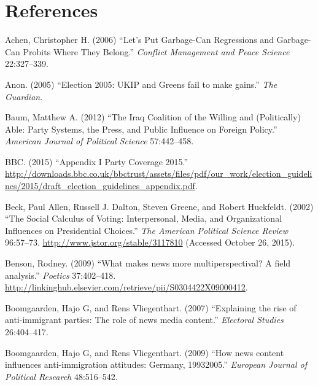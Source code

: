 \documentclass[12pt,article]{article}
\begin{document}
\pagebreak

\section{References}\label{references}

\raggedright

Achen, Christopher H. (2006) ``Let's Put Garbage-Can Regressions and
Garbage-Can Probits Where They Belong.'' \emph{Conflict Management and
Peace Science} 22:327--339.

Anon. (2005) ``Election 2005: UKIP and Greens fail to make gains.''
\emph{The Guardian}.

Baum, Matthew A. (2012) ``The Iraq Coalition of the Willing and
(Politically) Able: Party Systems, the Press, and Public Influence on
Foreign Policy.'' \emph{American Journal of Political Science}
57:442--458.

BBC. (2015) ``Appendix I Party Coverage 2015.''
\url{http://downloads.bbc.co.uk/bbctrust/assets/files/pdf/our_work/election_guidelines/2015/draft_election_guidelines_appendix.pdf}.

Beck, Paul Allen, Russell J. Dalton, Steven Greene, and Robert
Huckfeldt. (2002) ``The Social Calculus of Voting: Interpersonal, Media,
and Organizational Influences on Presidential Choices.'' \emph{The
American Political Science Review} 96:57--73.
\url{http://www.jstor.org/stable/3117810} (Accessed October 26, 2015).

Benson, Rodney. (2009) ``What makes news more multiperspectival? A field
analysis.'' \emph{Poetics} 37:402--418.
\url{http://linkinghub.elsevier.com/retrieve/pii/S0304422X09000412}.

Boomgaarden, Hajo G, and Rens Vliegenthart. (2007) ``Explaining the rise
of anti-immigrant parties: The role of news media content.''
\emph{Electoral Studies} 26:404--417.

Boomgaarden, Hajo G, and Rens Vliegenthart. (2009) ``How news content
influences anti-immigration attitudes: Germany, 19932005.''
\emph{European Journal of Political Research} 48:516--542.
\end{document}

